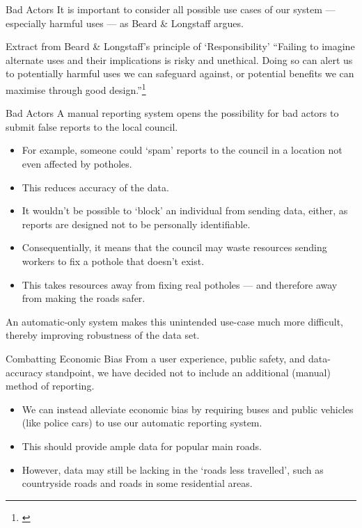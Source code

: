 \documentclass{beamer}
\begin{document}
\begin{frame}{Bad Actors}
    It is important to consider all possible use cases of our system --- especially harmful uses --- as Beard \& Longstaff argues.

    \begin{block}{Extract from Beard \& Longstaff's principle of `Responsibility'}
        ``Failing to imagine alternate uses and their implications is risky and
        unethical. Doing so can alert us to potentially harmful uses we can safeguard against,
        or potential benefits we can maximise through good design.''\footnote[frame]{\cite{principles-for-good-tech}}
    \end{block}
\end{frame}

\begin{frame}{Bad Actors}
    A manual reporting system opens the possibility for bad actors to submit false reports to the local council.

    \begin{itemize}
        \item For example, someone could `spam' reports to the council in a location not even affected by potholes.
        \item This reduces accuracy of the data.
        \item It wouldn't be possible to `block' an individual from sending data, either, as reports are designed not to be personally identifiable.
        \item Consequentially, it means that the council may waste resources sending workers to fix a pothole that doesn't exist.
        \item This takes resources away from fixing real potholes --- and therefore away from making the roads safer.
    \end{itemize}

    An automatic-only system makes this unintended use-case much more difficult, thereby improving robustness of the data set.
\end{frame}

\begin{frame}{Combatting Economic Bias}
    From a user experience, public safety, and data-accuracy standpoint, we have decided \alert{not} to include an additional (manual) method of reporting.

    \begin{itemize}
        \item We can instead alleviate economic bias by requiring buses and public vehicles (like police cars) to use our automatic reporting system.
        \item This should provide ample data for popular main roads.
        \item However, data may still be lacking in the `roads less travelled', such as countryside roads and roads in some residential areas.
    \end{itemize}
\end{frame}
\end{document}
